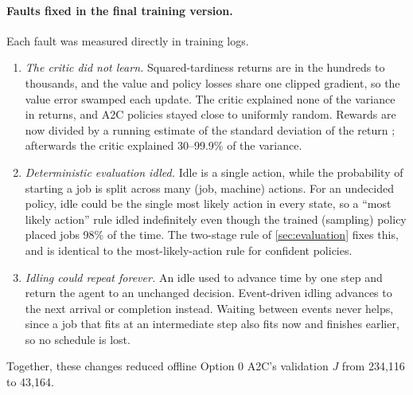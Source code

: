 \documentclass[12pt]{article}
\begin{document}
\paragraph{Faults fixed in the final training version.} Each fault was measured directly in training logs.
\begin{enumerate}[nosep]
    \item \emph{The critic did not learn.} Squared-tardiness returns are in the hundreds to thousands, and the value and policy losses share one clipped gradient, so the value error swamped each update. The critic explained none of the variance in returns, and A2C policies stayed close to uniformly random. Rewards are now divided by a running estimate of the standard deviation of the return \cite{engstrom2020implementation, andrychowicz2021onpolicy}; afterwards the critic explained 30--99.9\% of the variance.
    \item \emph{Deterministic evaluation idled.} Idle is a single action, while the probability of starting a job is split across many (job, machine) actions. For an undecided policy, idle could be the single most likely action in every state, so a ``most likely action'' rule idled indefinitely even though the trained (sampling) policy placed jobs 98\% of the time. The two-stage rule of \cref{sec:evaluation} fixes this, and is identical to the most-likely-action rule for confident policies.
    \item \emph{Idling could repeat forever.} An idle used to advance time by one step and return the agent to an unchanged decision. Event-driven idling advances to the next arrival or completion instead. Waiting between events never helps, since a job that fits at an intermediate step also fits now and finishes earlier, so no schedule is lost.
\end{enumerate}
Together, these changes reduced offline Option 0 A2C's validation $J$ from 234,116 to 43,164.
\end{document}
